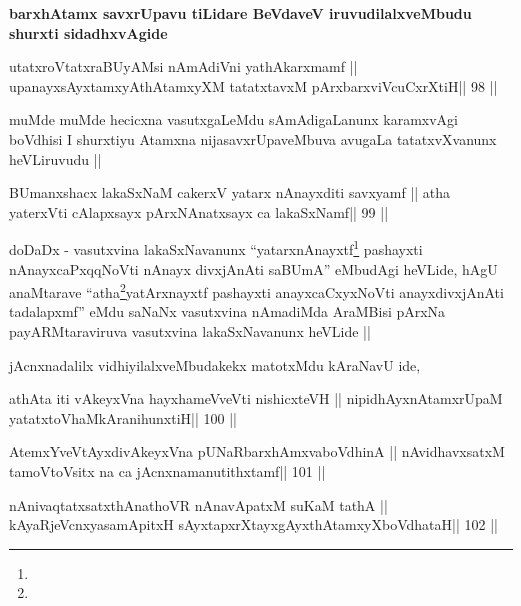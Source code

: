 \begin{artha}
\textbf{barxhAtamx savxrUpavu tiLidare BeVdaveV iruvudilalxveMbudu shurxti sidadhxvAgide}
\end{artha}

\begin{shl}
\footnotemark[1]utatxroVtatxraBUyAMsi nAmAdiVni yathAkarxmamf ||
upanayxsAyx\s\s tamxyAthAtamxyXM tatatxtavxM pArxbarxviVcuCxrXtiH\hfill || 98 ||
\end{shl}

\begin{artha}
muMde muMde hecicxna vasutxgaLeMdu sAmAdigaLanunx karamxvAgi boVdhisi
I shurxtiyu Atamxna nijasavxrUpaveMbuva avugaLa tatatxvXvanunx
heVLiruvudu ||
\end{artha}

\begin{shl}
BUmanxshacx lakaSxNaM cakerxV yatarx nAnayxditi savxyamf ||
atha yaterxVti cAlapxsayx pArxNAnatxsayx ca lakaSxNamf\hfill || 99 ||
\end{shl}

\begin{artha}
doDaDx - vasutxvina lakaSxNavanunx ``yatarxnAnayxtf\footnote[2]{}
pashayxti nAnayxcaPxqqNoVti nAnayx divxjAnAti saBUmA'' eMbudAgi
heVLide, hAgU anaMtarave ``atha\footnote[3]{}yatArxnayxtf pashayxti
anayxcaCxyxNoVti anayxdivxjAnAti tadalapxmf'' eMdu saNaNx vasutxvina
nAmadiMda AraMBisi pArxNa payARMtaraviruva vasutxvina lakaSxNavanunx
heVLide || 
\end{artha}

\begin{artha}
jAcnxnadalilx vidhiyilalxveMbudakekx matotxMdu kAraNavU ide, 
\end{artha}

\begin{shl}
athAta iti vAkeyxVna hayxhameVveVti nishicxteVH ||
nipidhAyxnAtamxrUpaM yatatxtoV\s haMkAranihunxtiH\hfill || 100 ||
\end{shl}

\begin{shl}
AtemxYveVtAyxdivAkeyxVna pUNaRbarxhAmxvaboVdhinA ||
nAvidhavxsatxM tamoV\s toV\s sitx na ca jAcnxnamanutithxtamf\hfill || 101 ||
\end{shl}

\begin{shl}
nAnivaqtatxsatxthA\s nathoVR nAnavApatxM suKaM tathA ||
kAyaRjeVcnxyasamApitxH sAyxtapxrXtayxgAyxthAtamxyXboVdhataH\hfill || 102 ||
\end{shl}

